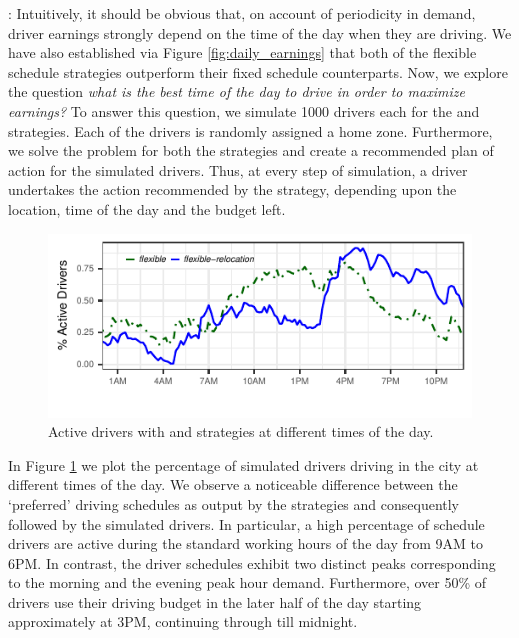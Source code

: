 : Intuitively, it should be obvious that, on account of periodicity in demand, driver earnings strongly depend on the time of the day when they are driving. We have also established via Figure \ref{fig:daily_earnings} that both of the flexible schedule strategies outperform their fixed schedule counterparts. Now, we explore the question \textit{what is the best time of the day to drive in order to maximize earnings?} To answer this question, we simulate 1000 drivers each for the {\flexible} and {\relocationflexible} strategies. Each of the drivers is randomly assigned a home zone. Furthermore, we solve the {\originalproblem} problem for both the strategies and create a recommended plan of action for the simulated drivers. Thus, at every step of simulation, a driver undertakes the action recommended by the strategy, depending upon the location, time of the day and the budget left.

\begin{figure}[H]
	\centering
	\includegraphics{figures/simulated_schedules.pdf}
	\caption{Active drivers with {\flexible} and {\relocationflexible}
	strategies at different times of the day.}
	\label{fig:simulated_schedules}
\end{figure}

In Figure \ref{fig:simulated_schedules} we plot the percentage of simulated drivers driving in the city at different times of the day. We observe a noticeable difference between the `preferred' driving schedules as output by the strategies and consequently followed by the simulated drivers. In particular, a high percentage of {\flexible} schedule drivers are active during the standard working hours of the day from 9AM to 6PM. In contrast, the {\relocationflexible} driver schedules exhibit two distinct peaks corresponding to the morning and the evening peak hour demand. Furthermore, over 50\% of {\relocationflexible} drivers use their driving budget in the later half of the day starting approximately at 3PM, continuing through till midnight. 

